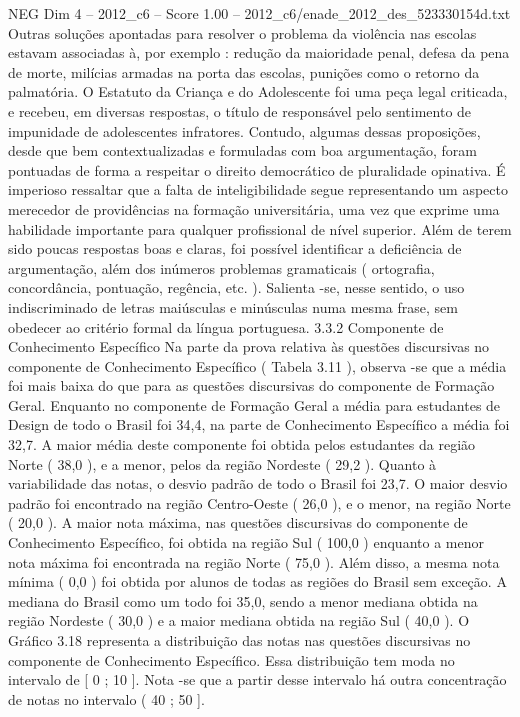 \begin{textsample}{NEG Dim 4 – 2012\_c6 – Score 1.00 – 2012\_c6/enade\_2012\_des\_523330154d.txt}
Outras soluções apontadas para resolver o problema da violência nas escolas estavam associadas à, por exemplo : redução da maioridade penal, defesa da pena de morte, milícias armadas na porta das escolas, punições como o retorno da palmatória.
O Estatuto da Criança e do Adolescente foi uma peça legal criticada, e recebeu, em diversas respostas, o título de responsável pelo sentimento de impunidade de adolescentes infratores.
Contudo, algumas dessas proposições, desde que bem contextualizadas e formuladas com boa argumentação, foram pontuadas de forma a respeitar o direito democrático de pluralidade opinativa.
É imperioso ressaltar que a falta de inteligibilidade segue representando um aspecto merecedor de providências na formação universitária, uma vez que exprime uma habilidade importante para qualquer profissional de nível superior.
Além de terem sido poucas respostas boas e claras, foi possível identificar a deficiência de argumentação, além dos inúmeros problemas gramaticais ( ortografia, concordância, pontuação, regência, etc. ).
Salienta -se, nesse sentido, o uso indiscriminado de letras maiúsculas e minúsculas numa mesma frase, sem obedecer ao critério formal da língua portuguesa. 3.3.2 Componente de Conhecimento Específico Na parte da prova relativa às questões discursivas no componente de Conhecimento Específico ( Tabela 3.11 ), observa -se que a média foi mais baixa do que para as questões discursivas do componente de Formação Geral.
Enquanto no componente de Formação Geral a média para estudantes de Design de todo o Brasil foi 34,4, na parte de Conhecimento Específico a média foi 32,7.
A maior média deste componente foi obtida pelos estudantes da região Norte ( 38,0 ), e a menor, pelos da região Nordeste ( 29,2 ).
Quanto à variabilidade das notas, o desvio padrão de todo o Brasil foi 23,7.
O maior desvio padrão foi encontrado na região Centro-Oeste ( 26,0 ), e o menor, na região Norte ( 20,0 ).
A maior nota máxima, nas questões discursivas do componente de Conhecimento Específico, foi obtida na região Sul ( 100,0 ) enquanto a menor nota máxima foi encontrada na região Norte ( 75,0 ).
Além disso, a mesma nota mínima ( 0,0 ) foi obtida por alunos de todas as regiões do Brasil sem exceção.
A mediana do Brasil como um todo foi 35,0, sendo a menor mediana obtida na região Nordeste ( 30,0 ) e a maior mediana obtida na região Sul ( 40,0 ).
O Gráfico 3.18 representa a distribuição das notas nas questões discursivas no componente de Conhecimento Específico.
Essa distribuição tem moda no intervalo de [ 0 ; 10 ].
Nota -se que a partir desse intervalo há outra concentração de notas no intervalo ( 40 ; 50 ].

\end{textsample}
